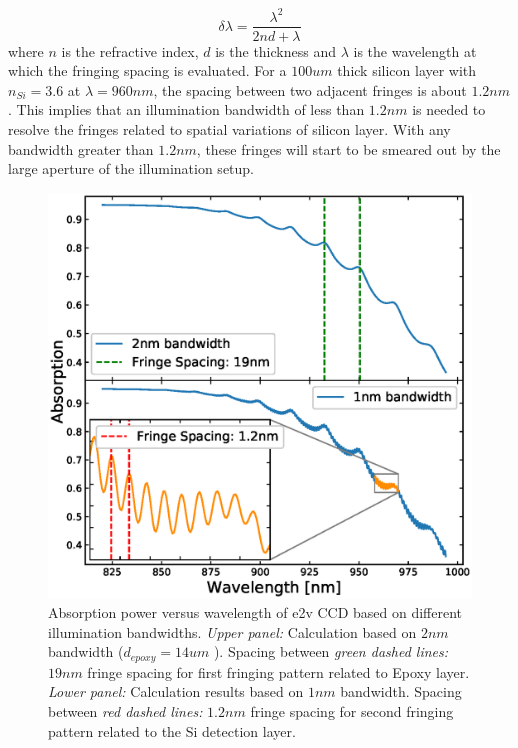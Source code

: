 \documentclass[twocolumn]{aastex63} %
\begin{document}
\begin{CJK*}{UTF8}{gbsn}
\begin{equation}  \label{eq:Fringe spacing}
    \delta\lambda = \frac{\lambda^2}{2nd + \lambda}
\end{equation}
where $n$ is the refractive index, $d$ is the thickness and $\lambda$ is the wavelength at which the fringing spacing is evaluated. For a $100um$ thick silicon layer with $n_{Si} = 3.6$ at $\lambda = 960 nm$, the spacing between two adjacent fringes is about $1.2 nm$. This implies that an illumination bandwidth of less than $1.2nm$ is needed to resolve the fringes related to spatial variations of silicon layer. With any bandwidth greater than $1.2nm$, these fringes will start to be smeared out by the large aperture of the illumination setup.
\begin{figure}[tb]
\centering
\includegraphics[scale = 0.45]{bandwidth_verify.eps}
\caption{Absorption power versus wavelength of e2v CCD based on different illumination bandwidths. {\it Upper panel:} Calculation based on $2nm$ bandwidth ($d_{epoxy}=14um$ ). Spacing between {\it green dashed lines:} $19nm$ fringe spacing for first fringing pattern related to Epoxy layer. {\it Lower panel:} Calculation results based on $1nm$ bandwidth. Spacing between {\it red dashed lines:} $1.2nm$ fringe spacing for second fringing pattern related to the Si detection layer.}
\label{fig:bandwidth_sim}
\end{figure}


\end{CJK*}
\end{document}
